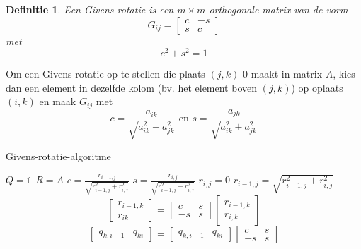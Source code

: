\documentclass{article}
\newtheorem{mydef}{Definitie}
\begin{document}
	\begin{mydef}
		Een Givens-rotatie is een $m \times m$ orthogonale matrix van de vorm
		$$
		G_{ij} = 
		\begin{bmatrix}
			c & -s \\
			s &  c  
		\end{bmatrix}
		$$
		met
		$$ c^2 + s^2 = 1 $$
	\end{mydef}

	Om een Givens-rotatie op te stellen die plaats $(j,k)$ $0$ maakt in matrix $A$, kies dan een element in dezelfde kolom (bv. het element boven $(j,k)$) op oplaats $(i,k)$ en maak $G_{ij}$ met
	$$ c = \frac{a_{ik}}{\sqrt{a_{ik}^2 + a_{jk}^2}} \text{ en } s = \frac{a_{jk}}{\sqrt{a_{ik}^2 + a_{jk}^2}}$$
	
	\pagebreak
	
	\begin{algorithm}[!ht]
		\caption{Givens-rotatie-algoritme}
		\begin{algorithmic}[1]
				\State $Q=\mathbb{1}$
				\State $R=A$
						\State $c = \frac{r_{i-1,j}}{\sqrt{r_{i-1,j}^2 + r_{i,j}^2}}$
						\State $s = \frac{r_{i,j}}{\sqrt{r_{i-1,j}^2 + r_{i,j}^2}}$
						\State $r_{i,j} = 0$
						\State $r_{i-1,j} = \sqrt{r_{i-1,j}^2 + r_{i,j}^2}$
							\State 
							$$
								\begin{bmatrix}
									r_{i-1,k} \\
									r_{ik}
								\end{bmatrix}
								=
								\begin{bmatrix}
									c & s \\
									-s & s
								\end{bmatrix}
								\begin{bmatrix}
									r_{i-1,k} \\
									r_{i,k}
								\end{bmatrix}
							$$
						\EndFor
							\State
							$$
								\begin{bmatrix}
									q_{k,i-1} & q_{ki}
								\end{bmatrix}
								=
								\begin{bmatrix}
									q_{k,i-1} & q_{ki}
								\end{bmatrix}
								\begin{bmatrix}
									c & s \\
									-s & s
								\end{bmatrix}
							$$
						\EndFor
					\EndFor
				\EndFor
			\EndProcedure
		\end{algorithmic}
	\end{algorithm}
\end{document}
